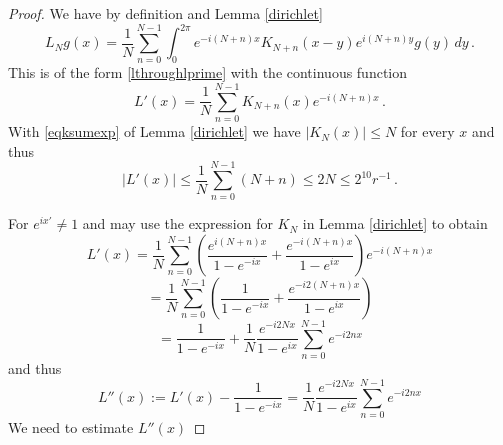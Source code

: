 \begin{proof}
We have by definition and Lemma \ref{dirichlet}
\begin{equation}
    L_Ng(x)=
    \frac 1N\sum_{n=0}^{N-1}
        \int_0^{2\pi} e^{-i(N+n)x} K_{N+n}(x-y) e^{i(N+n)y}g(y)
\, dy \, .\end{equation}
This is of the form \eqref{lthroughlprime} with
the continuous function
\begin{equation}
    {L'}(x)=  \frac 1N\sum_{n=0}^{N-1}
        K_{N+n}(x) e^{-i(N+n)x}\, .
\end{equation}
With \eqref{eqksumexp} of Lemma \ref{dirichlet}
we have $|K_N(x)|\le N$ for every $x$ and thus
\begin{equation}\label{eqhil13}
    |{L'}(x)|\le  \frac 1N\sum_{n=0}^{N-1}
        (N+n) \le 2N\le 2^{10} r^{-1}\, .
\end{equation}


For $e^{ix'}\neq 1$
and may use the expression
\label{eqksumhil} for $K_N$
in Lemma \ref{dirichlet} to obtain
\begin{equation*}
    {L'}(x)=  \frac 1N\sum_{n=0}^{N-1}
        \left(\frac{e^{i(N+n)x}}{1-e^{-ix}}
        +\frac {e^{-i(N+n)x}}{1-e^{ix}}\right) e^{-i(N+n)x}
\end{equation*}
\begin{equation*}
    =  \frac 1N\sum_{n=0}^{N-1}
    \left(\frac{1}{1-e^{-ix}}
        +\frac {e^{-i2(N+n)x}}{1-e^{ix}}\right)
\end{equation*}
\begin{equation}\label{eqhil3}
    =  \frac{1}{1-e^{-ix}} +
        \frac 1N \frac {e^{-i2Nx}}{1-e^{ix}}
        \sum_{n=0}^{N-1}
    {e^{-i2nx}}
\end{equation}
and thus
\begin{equation}
    L''(x):={L'}(x)  -\frac{1}{1-e^{-ix}}=\frac 1N \frac {e^{-i2Nx}}{1-e^{ix}}
        \sum_{n=0}^{N-1}
    {e^{-i2nx}}
\end{equation}
We need to estimate $L''(x)$



\end{proof}
